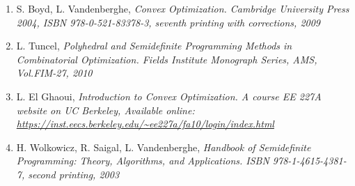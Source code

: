 \documentclass[12pt]{book}
\theoremstyle{definition}
\begin{document}
\begin{enumerate}
\renewcommand*\labelenumi{[\theenumi]}




%
\item S. Boyd, L. Vandenberghe, \it Convex Optimization. \rm Cambridge University Press 2004, ISBN 978-0-521-83378-3, seventh printing with corrections, 2009 
\label{BoydCvxOpt}
%
\item L. Tuncel, \it  Polyhedral and Semidefinite Programming Methods in Combinatorial Optimization. \rm  Fields Institute Monograph Series, AMS, Vol.FIM-27, 2010
\label{FieldsMono}
%
\item L. El Ghaoui, \it Introduction to Convex Optimization. \rm
A course EE 227A website on UC Berkeley, Available online: 
\url{https://inst.eecs.berkeley.edu/~ee227a/fa10/login/index.html}
\label{IntroToCvxOptBerkley}



\item H. Wolkowicz, R. Saigal, L. Vandenberghe, \it Handbook of Semidefinite Programming: Theory, Algorithms, and Applications. \rm
ISBN 978-1-4615-4381-7, second printing, 2003
\label{HandbookSDP}
%




\end{enumerate}
\end{document}
